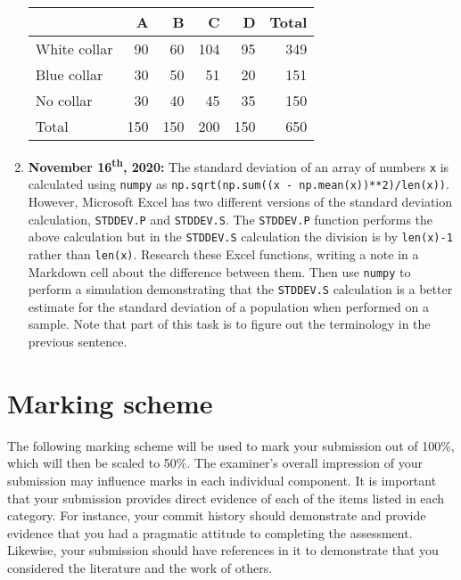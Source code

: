 \documentclass[a4paper, 12pt]{scrartcl}
\begin{document}
\begin{enumerate}
        \begin{table}[H]
          \setlength{\tabcolsep}{12pt}
          \renewcommand{\arraystretch}{1.1}
          \centering
          \begin{tabular}{lrrrrr}
            & A & B & C& D & Total \\
            \midrule
            White collar & 90 & 60 & 104 & 95 & 349 \\
            Blue collar & 30 & 50 & 51 & 20 & 151 \\
            No collar & 30 & 40 & 45 & 35 & 150 \\
            \midrule
            Total & 150 & 150 & 200 & 150 & 650
          \end{tabular}
        \end{table}
        \newpage
      \item
        \textbf{November 16\textsuperscript{th}, 2020:}
        The standard deviation of an array of numbers \texttt{x} is calculated using \texttt{numpy} as \texttt{np.sqrt(np.sum((x - np.mean(x))**2)/len(x))}.
        However, Microsoft Excel has two different versions of the standard deviation calculation, \texttt{STDDEV.P} and \texttt{STDDEV.S}.
        The \texttt{STDDEV.P} function performs the above calculation but in the \texttt{STDDEV.S} calculation the division is by \texttt{len(x)-1} rather than \texttt{len(x)}.
        Research these Excel functions, writing a note in a Markdown cell about the difference between them.
        Then use \texttt{numpy} to perform a simulation demonstrating that the \texttt{STDDEV.S} calculation is a better estimate for the standard deviation of a population when performed on a sample.
        Note that part of this task is to figure out the terminology in the previous sentence.
    \end{enumerate}

  \newpage

  \section*{Marking scheme}
    The following marking scheme will be used to mark your submission out of 100\%, which will then be scaled to 50\%.
    The examiner's overall impression of your submission may influence marks in each individual component.
    It is important that your submission provides direct evidence of each of the items listed in each category.
    For instance, your commit history should demonstrate and provide evidence that you had a pragmatic attitude to completing the assessment.
    Likewise, your submission should have references in it to demonstrate that you considered the literature and the work of others.
  
\end{document}
